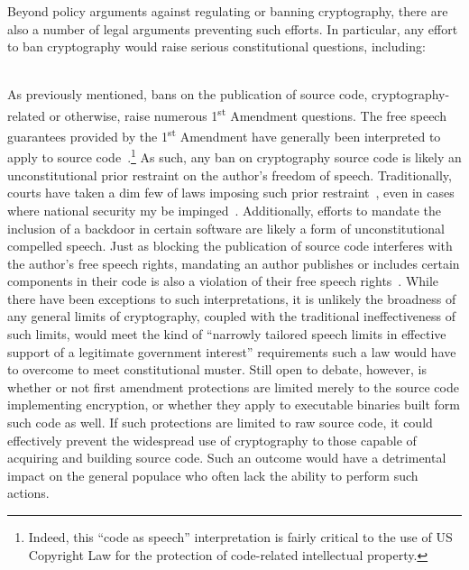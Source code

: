 Beyond policy arguments against regulating or banning cryptography,
there are also a number of legal arguments preventing such efforts. In
particular, any effort to ban cryptography would raise serious
constitutional questions, including:

\begin{packed_desc}
\item[1\textsuperscript{st} Amendment] \hfill \\ As previously
  mentioned, bans on the publication of source code,
  cryptography-related or otherwise, raise numerous
  1\textsuperscript{st} Amendment questions. The free speech
  guarantees provided by the 1\textsuperscript{st} Amendment have
  generally been interpreted to apply to source
  code~\cite{ninthcir-bernstein, sixthcir-junger}.\footnote{Indeed,
    this ``code as speech'' interpretation is fairly critical to the
    use of US Copyright Law for the protection of code-related
    intellectual property.} As such, any ban on cryptography source
  code is likely an unconstitutional prior restraint on the author's
  freedom of speech. Traditionally, courts have taken a dim few of
  laws imposing such prior restraint~\cite{scotus-nearvminnesota},
  even in cases where national security my be
  impinged~\cite{scotus-nytvus}. Additionally, efforts to mandate the
  inclusion of a backdoor in certain software are likely a form of
  unconstitutional compelled speech. Just as blocking the publication
  of source code interferes with the author's free speech rights,
  mandating an author publishes or includes certain components in
  their code is also a violation of their free speech
  rights~\cite{scotus-wooleyvmaynard}. While there have been
  exceptions to such interpretations, it is unlikely the broadness of
  any general limits of cryptography, coupled with the traditional
  ineffectiveness of such limits, would meet the kind of ``narrowly
  tailored speech limits in effective support of a legitimate
  government interest'' requirements such a law would have to overcome
  to meet constitutional muster. Still open to debate, however, is
  whether or not first amendment protections are limited merely to the
  source code implementing encryption, or whether they apply to
  executable binaries built form such code as well. If such
  protections are limited to raw source code, it could effectively
  prevent the widespread use of cryptography to those capable of
  acquiring and building source code. Such an outcome would have a
  detrimental impact on the general populace who often lack the
  ability to perform such actions.

\end{packed_desc}
